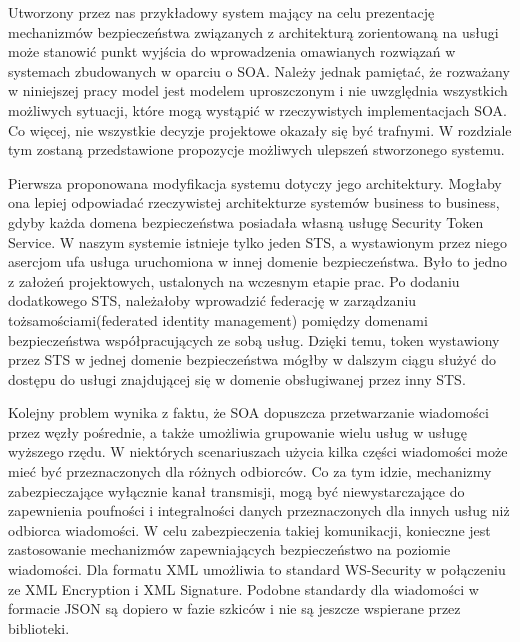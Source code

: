 
\label{sec:ulepszenia}

Utworzony przez nas przykładowy system mający na celu prezentację mechanizmów bezpieczeństwa związanych z architekturą zorientowaną na usługi może stanowić punkt wyjścia do wprowadzenia omawianych rozwiązań w systemach zbudowanych w oparciu o SOA. Należy jednak pamiętać, że rozważany w niniejszej pracy model jest modelem uproszczonym i nie uwzględnia wszystkich możliwych sytuacji, które mogą wystąpić w rzeczywistych implementacjach SOA. Co więcej, nie wszystkie decyzje projektowe okazały się być trafnymi. W rozdziale tym zostaną przedstawione propozycje możliwych ulepszeń stworzonego systemu.

Pierwsza proponowana modyfikacja systemu dotyczy jego architektury. Mogłaby ona lepiej odpowiadać rzeczywistej architekturze systemów business to business, gdyby każda domena bezpieczeństwa posiadała własną usługę Security Token Service. W naszym systemie istnieje tylko jeden STS, a wystawionym przez niego asercjom ufa usługa uruchomiona w innej domenie bezpieczeństwa. Było to jedno z założeń projektowych, ustalonych na wczesnym etapie prac. Po dodaniu dodatkowego STS, należałoby wprowadzić federację w zarządzaniu tożsamościami(federated identity management) pomiędzy domenami bezpieczeństwa współpracujących ze sobą usług. Dzięki temu, token wystawiony przez STS w jednej domenie bezpieczeństwa mógłby w dalszym ciągu służyć do dostępu do usługi znajdującej się w domenie obsługiwanej przez inny STS.

Kolejny problem wynika z faktu, że SOA dopuszcza przetwarzanie wiadomości przez węzły pośrednie, a także umożliwia grupowanie wielu usług w usługę wyższego rzędu. W niektórych scenariuszach użycia kilka części wiadomości może mieć być przeznaczonych dla różnych odbiorców. Co za tym idzie, mechanizmy zabezpieczające wyłącznie kanał transmisji, mogą być niewystarczające do zapewnienia poufności i integralności danych przeznaczonych dla innych usług niż odbiorca wiadomości. W celu zabezpieczenia takiej komunikacji, konieczne jest zastosowanie mechanizmów zapewniających bezpieczeństwo na poziomie wiadomości. Dla formatu XML umożliwia to standard WS-Security w połączeniu ze XML Encryption i XML Signature. Podobne standardy dla wiadomości w formacie JSON są dopiero w fazie szkiców\cite{JWE14}\cite{JWS14} i nie są jeszcze wspierane przez biblioteki.

